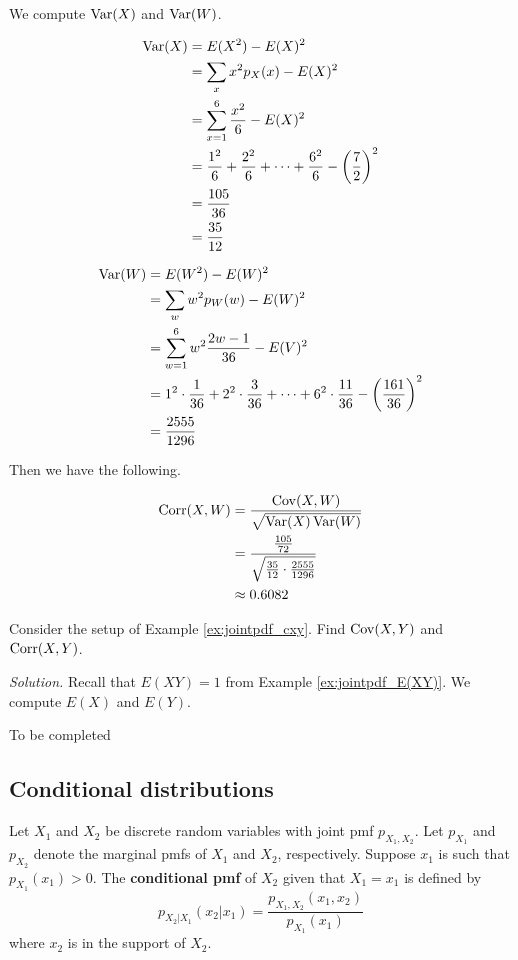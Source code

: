 \begin{example}[]
	We compute $\operatorname{Var}(X)$ and $\operatorname{Var}(W)$.

	\begin{align*}
		\operatorname{Var}(X)&=E(X^2)-E(X)^2\\
		&=\sum_xx^2p_X(x)-E(X)^2\\
		&=\sum_{x=1}^6\frac{x^2}{6}-E(X)^2\\
		&=\frac{1^2}{6}+\frac{2^2}{6}+\cdots+\frac{6^2}{6}-\left(\frac 72\right)^2\\
		&=\frac{105}{36}\\
		&=\frac{35}{12}
	\end{align*}

	\begin{align*}
		\operatorname{Var}(W)&=E(W^2)-E(W)^2\\
		&=\sum_ww^2p_W(w)-E(W)^2\\
		&=\sum_{w=1}^6w^2\frac{2w-1}{36}-E(V)^2\\
		&=1^2\cdot\frac{1}{36}+2^2\cdot\frac{3}{36}+\cdots+6^2\cdot\frac{11}{36}-\left(\frac{161}{36}\right)^2\\
		&=\frac{2555}{1296}
	\end{align*}

	Then we have the following.

	\begin{align*}
		\operatorname{Corr}(X,W)&=\frac{\operatorname{Cov}(X,W)}{\sqrt{\operatorname{Var}(X)\operatorname{Var}(W)}}\\
		&=\frac{\frac{105}{72}}{\sqrt{\frac{35}{12}\cdot\frac{2555}{1296}}}\\
		&\approx 0.6082
	\end{align*}
\end{example}

\begin{example}[]
	Consider the setup of Example \ref{ex:jointpdf_cxy}. Find $\operatorname{Cov}(X,Y)$ and $\operatorname{Corr}(X,Y)$.

	\textit{Solution.} Recall that $E(XY)=1$ from Example \ref{ex:jointpdf_E(XY)}. We compute $E(X)$ and $E(Y)$.

	To be completed
\end{example}

\subsection{Conditional distributions}

\begin{definition}
	Let $X_1$ and $X_2$ be discrete random variables with joint pmf $p_{X_1,X_2}$. Let $p_{X_1}$ and $p_{X_2}$ denote the marginal pmfs of $X_1$ and $X_2$, respectively. Suppose $x_1$ is such that $p_{X_1}(x_1)>0$. The \textbf{conditional pmf} of $X_2$ given that $X_1=x_1$ is defined by
	$$p_{X_2|X_1}(x_2|x_1)=\frac{p_{X_1,X_2}(x_1,x_2)}{p_{X_1}(x_1)}$$
	where $x_2$ is in the support of $X_2$.
\end{definition}

